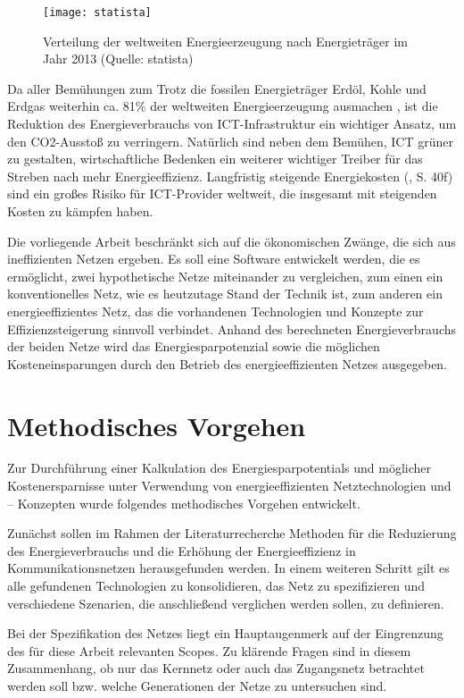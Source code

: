 \documentclass[12pt,titlepage]{article}
\begin{document}
\begin{figure}[!ht]
    \centering
    \texttt{[image: statista]}
    \caption{Verteilung der weltweiten Energieerzeugung nach Energieträger im Jahr 2013 (Quelle: statista)}
    \label{fig:statista}
\end{figure}

Da aller Bemühungen zum Trotz die fossilen Energieträger Erdöl, Kohle und Erdgas weiterhin ca. 81\% der weltweiten Energieerzeugung ausmachen \cite{statista}, ist die Reduktion des Energieverbrauchs von ICT-Infrastruktur ein wichtiger Ansatz, um den CO2-Ausstoß zu verringern. Natürlich sind neben dem Bemühen, ICT grüner zu gestalten, wirtschaftliche Bedenken ein weiterer wichtiger Treiber für das Streben nach mehr Energieeffizienz. Langfristig steigende Energiekosten (\cite{iea2015}, S. 40f) sind ein großes Risiko für ICT-Provider weltweit, die insgesamt mit steigenden Kosten zu kämpfen haben.
 
Die vorliegende Arbeit beschränkt sich auf die ökonomischen Zwänge, die sich aus ineffizienten Netzen ergeben. Es soll eine Software entwickelt werden, die es ermöglicht, zwei hypothetische Netze miteinander zu vergleichen, zum einen ein konventionelles Netz, wie es heutzutage Stand der Technik ist, zum anderen ein energieeffizientes Netz, das die vorhandenen Technologien und Konzepte zur Effizienzsteigerung sinnvoll verbindet. Anhand des berechneten Energieverbrauchs der beiden Netze wird das Energiesparpotenzial sowie die möglichen Kosteneinsparungen durch den Betrieb des energieeffizienten Netzes ausgegeben.


\section{Methodisches Vorgehen}
Zur Durchführung einer Kalkulation des Energiesparpotentials und möglicher Kostenersparnisse unter Verwendung von energieeffizienten Netztechnologien und – Konzepten wurde folgendes methodisches Vorgehen entwickelt. 
 
Zunächst sollen im Rahmen der Literaturrecherche Methoden für die Reduzierung des Energieverbrauchs und die Erhöhung der Energieeffizienz in Kommunikationsnetzen herausgefunden werden. In einem weiteren Schritt gilt es alle gefundenen Technologien zu konsolidieren, das Netz zu spezifizieren und verschiedene Szenarien, die anschließend verglichen werden sollen, zu definieren. 
 
Bei der Spezifikation des Netzes liegt ein Hauptaugenmerk auf der Eingrenzung des für diese Arbeit relevanten Scopes. Zu klärende Fragen sind in diesem Zusammenhang, ob nur das Kernnetz oder auch das Zugangsnetz betrachtet werden soll bzw. welche Generationen der Netze zu untersuchen sind. 
 
\end{document}

